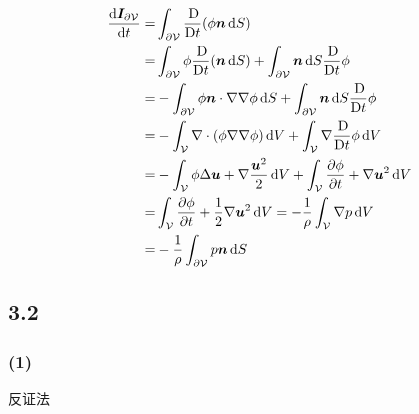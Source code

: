 \documentclass[12pt]{article}
\begin{document}
\begin{equation}
	\begin{aligned}
		\frac{\dif \boldsymbol{I}_{\partial \mathcal{V}}}{\dif t}=&\int_{\partial \mathcal{V}} \frac{\Dif}{\Dif t}(\phi \boldsymbol{n} \dif S)\\
		=&\int_{\partial \mathcal{V}} \phi\frac{\Dif}{\Dif t}( \boldsymbol{n} \dif S) + \int_{\partial \mathcal{V}} \boldsymbol{n} \dif S\frac{\Dif}{\Dif t}\phi \\
		=&-\int_{\partial \mathcal{V}} \phi \bm{n} \cdot \nabla\nabla \phi \dif S + \int_{\partial \mathcal{V}} \boldsymbol{n} \dif S\frac{\Dif}{\Dif t}\phi \\
		=&-\int_{ \mathcal{V}} \nabla \cdot (\phi \nabla\nabla \phi) \dif V  + \int_{ \mathcal{V}} \nabla \frac{\Dif}{\Dif t}\phi \dif V \\
		=&-\int_{ \mathcal{V}} \phi \Delta \bm{u} +\nabla \frac{\bm{u}^2}{2} \dif V  + \int_{ \mathcal{V}} \frac{\partial \phi }{\partial t} + \nabla\bm{u}^2 \dif V \\
		=& \int_{ \mathcal{V}} \frac{\partial \phi }{\partial t} + \frac{1}{2} \nabla\bm{u}^2 \dif V =- \frac{1}{\rho} \int_{ \mathcal{V}} \nabla p \dif V \\
		=&- \frac{1}{\rho} \int_{\partial \mathcal{V}}  p \bm{n} \dif S \\
	\end{aligned}
\end{equation}

\subsection{3.2}

\subsubsection{(1)}

反证法
\end{document}
